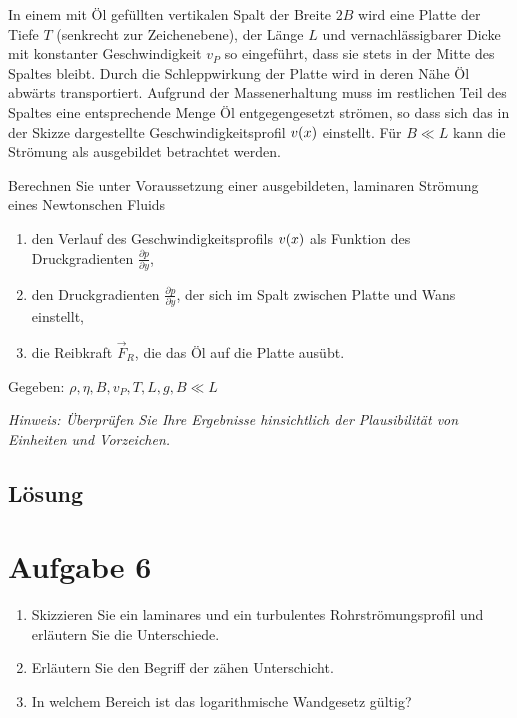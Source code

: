 \documentclass{exercise}
\begin{document}
    \begin{problem}
        In einem mit Öl gefüllten vertikalen Spalt der Breite \(2B\) wird eine Platte der Tiefe \(T\) (senkrecht zur Zeichenebene), der Länge \(L\) und vernachlässigbarer Dicke mit konstanter Geschwindigkeit \(v_P\) so eingeführt, dass sie stets in der Mitte des Spaltes bleibt.
        Durch die Schleppwirkung der Platte wird in deren Nähe Öl abwärts transportiert.
        Aufgrund der Massenerhaltung muss im restlichen Teil des Spaltes eine entsprechende Menge Öl entgegengesetzt strömen, so dass sich das in der Skizze dargestellte Geschwindigkeitsprofil \(v\parentheses*{x}\) einstellt.
        Für \(B \ll L\) kann die Strömung als ausgebildet betrachtet werden.

        Berechnen Sie unter Voraussetzung einer ausgebildeten, laminaren Strömung eines Newtonschen Fluids
        \begin{enumerate}
            \item den Verlauf des Geschwindigkeitsprofils \(v\parentheses*{x}\) als Funktion des Druckgradienten \(\frac{\partial p}{\partial y}\),
            \item den Druckgradienten \(\frac{\partial p}{\partial y}\), der sich im Spalt zwischen Platte und Wans einstellt,
            \item die Reibkraft \(\vec{F}_R\), die das Öl auf die Platte ausübt.
        \end{enumerate}

        Gegeben: \(\rho, \eta, B, v_P, T, L, g, B \ll L\)        

        \emph{Hinweis: Überprüfen Sie Ihre Ergebnisse hinsichtlich der Plausibilität von Einheiten und Vorzeichen.}
    \end{problem}

    \subsection*{Lösung}


    \section*{Aufgabe 6}

    \begin{problem}
        \begin{enumerate}
            \item Skizzieren Sie ein laminares und ein turbulentes Rohrströmungsprofil und erläutern Sie die Unterschiede.
            \item Erläutern Sie den Begriff der zähen Unterschicht.
            \item In welchem Bereich ist das logarithmische Wandgesetz gültig?
        \end{enumerate}
    \end{problem}
\end{document}
